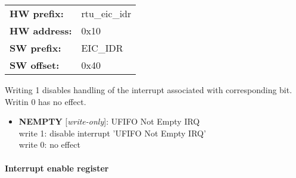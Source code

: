 \begin{tabular}{l l }
{\bf HW prefix:}  & rtu\_eic\_idr\\
{\bf HW address:}  & 0x10\\
{\bf SW prefix:}  & EIC\_IDR\\
{\bf SW offset:}  & 0x40\\
\end{tabular}

\vspace{12pt}
Writing 1 disables handling of the interrupt associated with corresponding bit. Writin 0 has no effect.

\vspace{12pt}
\noindent
{}

\begin{itemize}
\item \begin{small}
{\bf 
NEMPTY
} [\emph{write-only}]: UFIFO Not Empty IRQ
\\
write 1: disable interrupt 'UFIFO Not Empty IRQ'\\write 0: no effect
\end{small}
\end{itemize}
\paragraph*{Interrupt enable register}\vspace{12pt}


